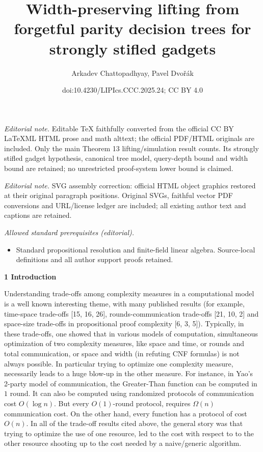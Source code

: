 \documentclass[10pt,a4paper]{article}
\title{Width-preserving lifting from forgetful parity decision trees for strongly stifled gadgets}
\author{Arkadev Chattopadhyay, Pavel Dvořák}
\date{doi:10.4230/LIPIcs.CCC.2025.24; CC BY 4.0}
\begin{document}
\maketitle
\noindent\textit{Editorial note.} Editable TeX faithfully converted from the official CC BY LaTeXML HTML prose and math alttext; the official PDF/HTML originals are included. Only the main Theorem 13 lifting/simulation result counts. Its strongly stifled gadget hypothesis, canonical tree model, query-depth bound and width bound are retained; no unrestricted proof-system lower bound is claimed.\par\medskip
\noindent\textit{Editorial note.} SVG assembly correction: official HTML object graphics restored at their original paragraph positions. Original SVGs, faithful vector PDF conversions and URL/license ledger are included; all existing author text and captions are retained.\par\medskip
\noindent\textit{Allowed standard prerequisites (editorial).}\begin{itemize}
\item Standard propositional resolution and finite-field linear algebra. Source-local definitions and all author support proofs retained.
\end{itemize}\medskip


\par\medskip\noindent\textbf{
1 Introduction}\par




Understanding trade-offs among complexity measures in a computational model is a well known interesting theme, with many published results (for example, time-space trade-offs [15, 16, 26], rounds-communication trade-offs [21, 10, 2] and space-size trade-offs in propositional proof complexity [6, 3, 5]). Typically, in these trade-offs, one showed that in various models of computation, simultaneous optimization of two complexity measures, like space and time, or rounds and total communication, or space and width (in refuting CNF formulas) is not always possible. In particular trying to optimize one complexity measure, necessarily leads to a huge blow-up in the other measure. For instance, in Yao’s 2-party model of communication, the Greater-Than function can be computed in $1$ round. It can also be computed using randomized protocols of communication cost $O(\log n)$. But every $O(1)$-round protocol, requires $\Omega(n)$ communication cost. On the other hand, every function has a protocol of cost $O(n)$. In all of the trade-off results cited above, the general story was that trying to optimize the use of one resource, led to the cost with respect to to the other resource shooting up to the cost needed by a naive/generic algorithm.\par
\end{document}
